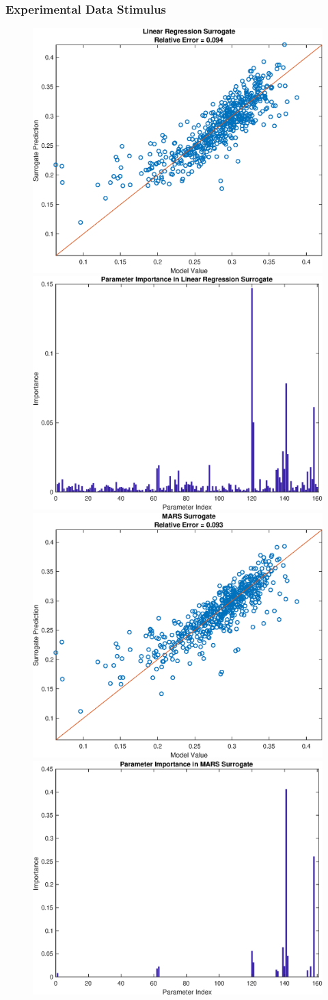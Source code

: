 \documentclass[12pt]{article}
\numberwithin{equation}{section}
\begin{document}
\newpage

\subsubsection{Experimental Data Stimulus}

\begin{figure}[h]
\centering
\includegraphics[width=.49 \textwidth]{Figures/AM_AMp_Min_QoI_LR_Prediction_Experimental.eps}
\includegraphics[width=.49 \textwidth]{Figures/AM_AMp_Min_QoI_LR_VI_Experimental.eps}\\
\includegraphics[width=.49 \textwidth]{Figures/AM_AMp_Min_QoI_MARS_Prediction_Experimental.eps}
\includegraphics[width=.49 \textwidth]{Figures/AM_AMp_Min_QoI_MARS_VI_Experimental.eps}
\end{figure}
\end{document}
